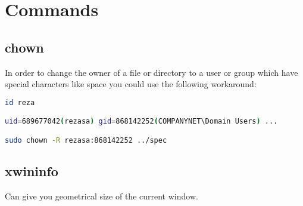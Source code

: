 \section{Commands}
\subsection{chown}
In order to change the owner of a file or directory to a user or group which have special characters like space you could use the following workaround:
\begin{lstlisting}[language=bash,caption={Process Tree}]
id reza

uid=689677042(rezasa) gid=868142252(COMPANYNET\Domain Users) ...

sudo chown -R rezasa:868142252 ../spec
\end{lstlisting}

\subsection{xwininfo}
Can give you geometrical size of the current window.
